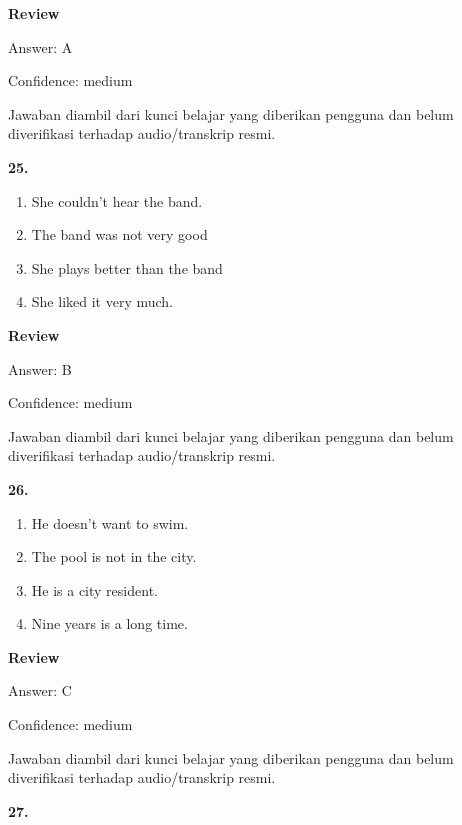 \documentclass[12pt]{article}
\begin{document}
\begingroup
\setlength{\parskip}{0pt}
\setlength{\parindent}{0pt}
\textbf{Review}\par
Answer: A\par
Confidence: medium\par
Jawaban diambil dari kunci belajar yang diberikan pengguna dan belum diverifikasi terhadap audio/transkrip resmi.\par
\endgroup
\par
\vspace{0.25\baselineskip}
\noindent\textbf{25.}
\begin{enumerate}[label=(\Alph*),leftmargin=*,itemsep=0.2em]
\item She couldn't hear the band.
\item The band was not very good
\item She plays better than the band
\item She liked it very much.
\end{enumerate}
\par
\begingroup
\setlength{\parskip}{0pt}
\setlength{\parindent}{0pt}
\textbf{Review}\par
Answer: B\par
Confidence: medium\par
Jawaban diambil dari kunci belajar yang diberikan pengguna dan belum diverifikasi terhadap audio/transkrip resmi.\par
\endgroup
\par
\vspace{0.25\baselineskip}
\noindent\textbf{26.}
\begin{enumerate}[label=(\Alph*),leftmargin=*,itemsep=0.2em]
\item He doesn't want to swim.
\item The pool is not in the city.
\item He is a city resident.
\item Nine years is a long time.
\end{enumerate}
\par
\begingroup
\setlength{\parskip}{0pt}
\setlength{\parindent}{0pt}
\textbf{Review}\par
Answer: C\par
Confidence: medium\par
Jawaban diambil dari kunci belajar yang diberikan pengguna dan belum diverifikasi terhadap audio/transkrip resmi.\par
\endgroup
\par
\vspace{0.25\baselineskip}
\noindent\textbf{27.}
\end{document}
